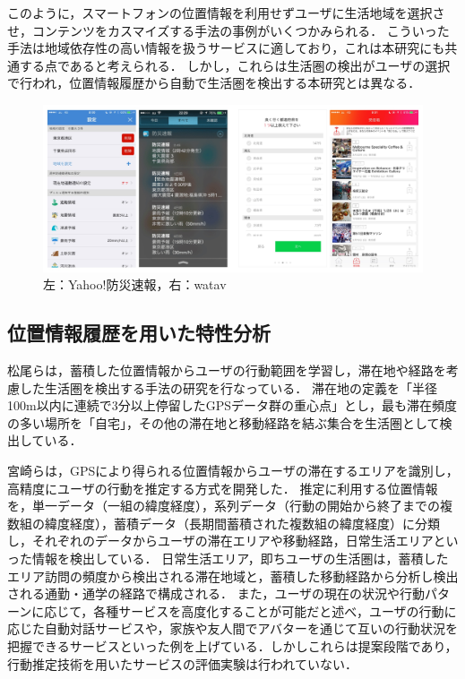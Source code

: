 \documentclass[a4paper]{jsarticle}
\begin{document}

このように，スマートフォンの位置情報を利用せずユーザに生活地域を選択させ，コンテンツをカスマイズする手法の事例がいくつかみられる．
こういった手法は地域依存性の高い情報を扱うサービスに適しており，これは本研究にも共通する点であると考えられる．
しかし，これらは生活圏の検出がユーザの選択で行われ，位置情報履歴から自動で生活圏を検出する本研究とは異なる．

\fifigure
\begin{figure}[H]
  \begin{center}
    \includegraphics[width=1.0\hsize]{./images/yahoo_watav.jpg}
    \caption{左：Yahoo!防災速報，右：watav}
    \label{fig:yahoo-watav}
  \end{center}
\end{figure}
\fi


\subsection{位置情報履歴を用いた特性分析}
松尾らは，蓄積した位置情報からユーザの行動範囲を学習し，滞在地や経路を考慮した生活圏を検出する手法の研究を行なっている\cite{matsuo}．
滞在地の定義を「半径100m以内に連続で3分以上停留したGPSデータ群の重心点」とし，最も滞在頻度の多い場所を「自宅」，その他の滞在地と移動経路を結ぶ集合を生活圏として検出している．

宮崎らは，GPSにより得られる位置情報からユーザの滞在するエリアを識別し，高精度にユーザの行動を推定する方式を開発した\cite{docomo}．
推定に利用する位置情報を，単一データ（一組の緯度経度），系列データ（行動の開始から終了までの複数組の緯度経度），蓄積データ（長期間蓄積された複数組の緯度経度）に分類し，それぞれのデータからユーザの滞在エリアや移動経路，日常生活エリアといった情報を検出している．
日常生活エリア，即ちユーザの生活圏は，蓄積したエリア訪問の頻度から検出される滞在地域と，蓄積した移動経路から分析し検出される通勤・通学の経路で構成される．
また，ユーザの現在の状況や行動パターンに応じて，各種サービスを高度化することが可能だと述べ，ユーザの行動に応じた自動対話サービスや，家族や友人間でアバターを通じて互いの行動状況を把握できるサービスといった例を上げている．しかしこれらは提案段階であり，行動推定技術を用いたサービスの評価実験は行われていない．
\end{document}
